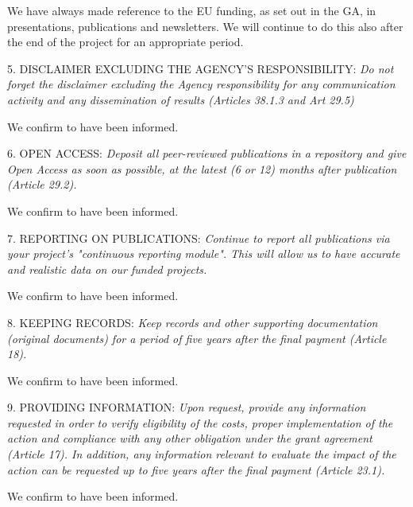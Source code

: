 We have always made reference to the EU funding, as set out in the GA, in presentations, publications and newsletters. We will continue to do this also after the end of the project for an appropriate period.

5. DISCLAIMER EXCLUDING THE AGENCY’S RESPONSIBILITY: {\it Do not forget the disclaimer excluding the Agency responsibility for any communication activity and any dissemination of results (Articles 38.1.3 and Art 29.5)
 }

We confirm to have been informed.

6. OPEN ACCESS: {\it Deposit all peer-reviewed publications in a repository and give Open Access as soon as possible, at the latest (6 or 12) months after publication (Article 29.2). }

We confirm to have been informed.

7. REPORTING ON PUBLICATIONS: {\it Continue to report all publications via your project's "continuous reporting module". This will allow us to have accurate and realistic data on our funded projects. }

We confirm to have been informed.

8. KEEPING RECORDS: {\it Keep records and other supporting documentation (original documents) for a period of five years after the final payment (Article 18). }

We confirm to have been informed.

9. PROVIDING INFORMATION: {\it Upon request, provide any information requested in order to verify eligibility of the costs, proper implementation of the action and compliance with any other obligation under the grant agreement (Article 17). In addition, any information relevant to evaluate the impact of the action can be requested up to five years after the final payment (Article 23.1).}

We confirm to have been informed.

